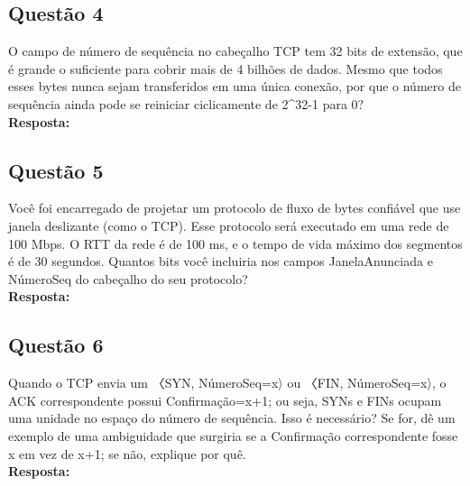 \subsection{Questão 4}
O campo de número de sequência no cabeçalho TCP tem 32 bits de extensão, que é grande o
suficiente para cobrir mais de 4 bilhões de dados. Mesmo que todos esses bytes nunca sejam
transferidos em uma única conexão, por que o número de sequência ainda pode se reiniciar
ciclicamente de 2^{32}-1 para 0?\\

\noindent
\textbf{Resposta:}

\subsection{Questão 5}
Você foi encarregado de projetar um protocolo de fluxo de bytes confiável que use janela
deslizante (como o TCP). Esse protocolo será executado em uma rede de 100 Mbps. O RTT da
rede é de 100 ms, e o tempo de vida máximo dos segmentos é de 30 segundos.
Quantos bits você incluiria nos campos JanelaAnunciada e NúmeroSeq do cabeçalho do seu
protocolo?\\

\noindent
\textbf{Resposta:}

\subsection{Questão 6}
Quando o TCP envia um 〈SYN, NúmeroSeq=x〉 ou 〈FIN, NúmeroSeq=x〉, o ACK correspondente
possui Confirmação=x+1; ou seja, SYNs e FINs ocupam uma unidade no espaço do número
de sequência. Isso é necessário? Se for, dê um exemplo de uma ambiguidade que surgiria se a
Confirmação correspondente fosse x em vez de x+1; se não, explique por quê.\\

\noindent
\textbf{Resposta:}